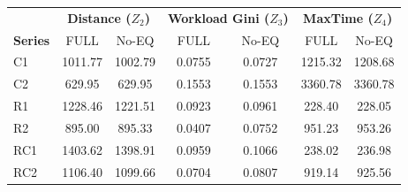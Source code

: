 \begin{tabular}{l|cc|cc|cc}
\toprule
& \multicolumn{2}{c|}{\textbf{Distance ($Z_2$)}} & \multicolumn{2}{c|}{\textbf{Workload Gini ($Z_3$)}} & \multicolumn{2}{c}{\textbf{MaxTime ($Z_4$)}} \\
\textbf{Series} & FULL & No-EQ & FULL & No-EQ & FULL & No-EQ \\
\midrule
C1 & 1011.77 & 1002.79 & 0.0755 & 0.0727 & 1215.32 & 1208.68 \\
C2 & 629.95 & 629.95 & 0.1553 & 0.1553 & 3360.78 & 3360.78 \\
R1 & 1228.46 & 1221.51 & 0.0923 & 0.0961 & 228.40 & 228.05 \\
R2 & 895.00 & 895.33 & 0.0407 & 0.0752 & 951.23 & 953.26 \\
RC1 & 1403.62 & 1398.91 & 0.0959 & 0.1066 & 238.02 & 236.98 \\
RC2 & 1106.40 & 1099.66 & 0.0704 & 0.0807 & 919.14 & 925.56 \\
\bottomrule
\end{tabular}
